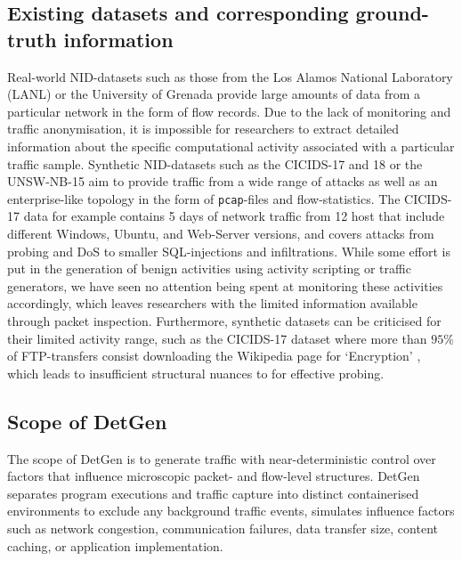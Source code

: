 \subsection{Existing datasets and corresponding ground-truth information}\label{Sec:ExData}

Real-world NID-datasets such as those from the Los Alamos National Laboratory \cite{kent-2015-cyberdata1} (LANL) or the University of Grenada \cite{macia2018ugr} provide large amounts of data from a particular network in the form of flow records. Due to the lack of monitoring and traffic anonymisation, it is impossible for researchers to extract detailed information about the specific computational activity associated with a particular traffic sample.
Synthetic NID-datasets such as the CICIDS-17 and 18 \cite{sharafaldin2018toward} or the UNSW-NB-15 \cite{moustafa2015unsw} aim to provide traffic from a wide range of attacks as well as an enterprise-like topology in the form of \texttt{pcap}-files and flow-statistics. The CICIDS-17 data for example contains 5 days of network traffic from 12 host that include different Windows, Ubuntu, and Web-Server versions, and covers attacks from probing and DoS to smaller SQL-injections and infiltrations.
While some effort is put in the generation of benign activities using activity scripting or traffic generators, we have seen no attention being spent at monitoring these activities accordingly, which leaves researchers with the limited information available through packet inspection. Furthermore, synthetic datasets can be criticised for their limited activity range, such as the CICIDS-17 dataset where more than $95\%$ of FTP-transfers consist downloading the Wikipedia page for ‘Encryption’ \cite{ring2019survey}, which leads to insufficient structural nuances to for effective probing.


\subsection{Scope of DetGen}

The scope of DetGen is to generate traffic with near-deterministic control over factors that influence microscopic packet- and flow-level structures. DetGen separates program executions and traffic capture into distinct containerised environments to exclude any background traffic events, simulates influence factors such as network congestion, communication failures, data transfer size, content caching, or application implementation. %

